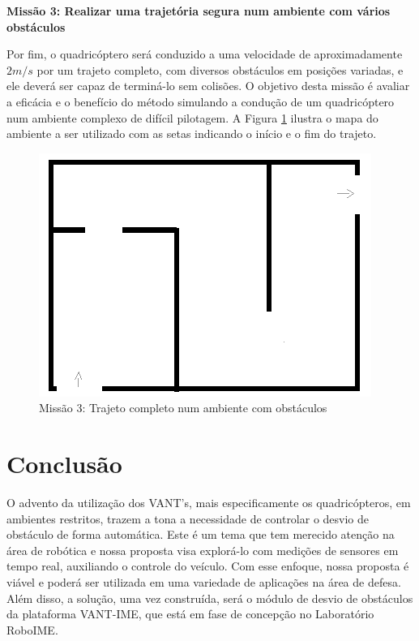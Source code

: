\documentclass[a4paper, 12pt]{article}
\begin{document}
 \noindent\textbf{Missão 3: Realizar uma trajetória segura num ambiente com vários obstáculos} 
  
 Por fim, o quadricóptero será conduzido a uma velocidade de aproximadamente $2m/s$ por um trajeto completo, com diversos obstáculos em posições variadas, e ele deverá ser capaz de terminá-lo sem colisões. O objetivo desta missão é avaliar a eficácia e o benefício do método simulando a condução de um quadricóptero num ambiente complexo de difícil pilotagem. A Figura \ref{fig:missao3} ilustra o mapa do ambiente a ser utilizado com as setas indicando o início e o fim do trajeto.
  
  
 \begin{figure}[h]
 	\centering
 	\includegraphics[scale=0.4]{img/missao3.png}
 	\caption{Missão 3: Trajeto completo num ambiente com obstáculos}
 	\label{fig:missao3}
 \end{figure}  
  
\newpage

\section{Conclusão}
\label{sec:conclusao}

O advento da utilização dos VANT's, mais especificamente os quadricópteros, em ambientes restritos, trazem a tona a necessidade de controlar o desvio de obstáculo de forma automática. Este é um tema que tem merecido atenção na área de robótica e nossa proposta visa explorá-lo com medições de sensores em tempo real, auxiliando o controle do veículo. Com esse enfoque, nossa proposta é viável e poderá ser utilizada em uma variedade de aplicações na área de defesa.  Além disso, a solução, uma vez construída, será o módulo de desvio de obstáculos da plataforma VANT-IME, que está em fase de concepção no Laboratório RoboIME.
\end{document}
